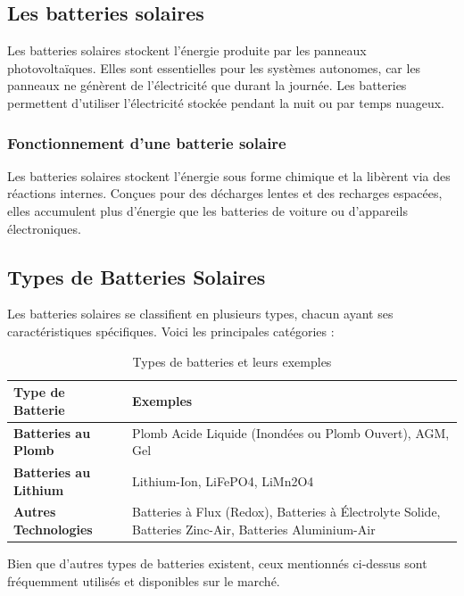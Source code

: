 \subsection{Les batteries solaires}

Les batteries solaires stockent l'énergie produite par les panneaux photovoltaïques. Elles sont essentielles pour les systèmes autonomes, car les panneaux ne génèrent de l'électricité que durant la journée. Les batteries permettent d'utiliser l'électricité stockée pendant la nuit ou par temps nuageux.

\subsubsection{Fonctionnement d’une batterie solaire}

Les batteries solaires stockent l'énergie sous forme chimique et la libèrent via des réactions internes. Conçues pour des décharges lentes et des recharges espacées, elles accumulent plus d’énergie que les batteries de voiture ou d’appareils électroniques.


\subsection{Types de Batteries Solaires}

Les batteries solaires se classifient en plusieurs types, chacun ayant ses caractéristiques spécifiques. Voici les principales catégories \cite{a3} \cite{a4} :

\begin{table}[h!]
	\centering
	\begin{tabular}{|>{\centering\arraybackslash}m{5cm}|>{\centering\arraybackslash}m{10cm}|}
		\hline
		\textbf{Type de Batterie} & \textbf{Exemples} \\ \hline
		\rule[0.5cm]{0cm}{0cm} \textbf{Batteries au Plomb} & Plomb Acide Liquide (Inondées ou Plomb Ouvert), AGM, Gel \\ \hline
		\rule[0.5cm]{0cm}{0cm} \textbf{Batteries au Lithium} & Lithium-Ion, LiFePO4, LiMn2O4 \\ \hline
		\rule[0.5cm]{0cm}{0cm} \textbf{Autres Technologies} & Batteries à Flux (Redox), Batteries à Électrolyte Solide, Batteries Zinc-Air, Batteries Aluminium-Air \\ \hline
	\end{tabular}
	\caption{Types de batteries et leurs exemples}
\end{table}
	

Bien que d'autres types de batteries existent, ceux mentionnés ci-dessus sont fréquemment utilisés et disponibles sur le marché.

